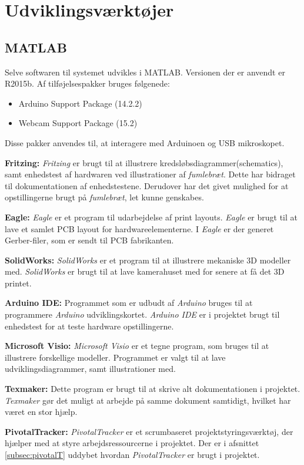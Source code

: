 \section{Udviklingsværktøjer}
\subsection{MATLAB}
Selve softwaren til systemet udvikles i MATLAB. Versionen der er anvendt er R2015b. Af tilføjelsespakker bruges følgenede:
\begin{itemize}
\item Arduino Support Package (14.2.2)
\item Webcam Support Package (15.2)
\end{itemize}
Disse pakker anvendes til, at interagere med Arduinoen og USB mikroskopet.

\textbf{Fritzing:} \textit{Fritzing} er brugt til at illustrere kredsløbsdiagrammer(schematics), samt enhedstest af hardwaren ved illustrationer af \textit{fumlebræt}. Dette har bidraget til dokumentationen af  enhedstestene. Derudover har det givet mulighed for at opstillingerne brugt på \textit{fumlebræt}, let kunne genskabes.

\textbf{Eagle:} \textit{Eagle} er et program til udarbejdelse af print layouts. \textit{Eagle} er brugt til at lave et samlet PCB layout for hardwareelementerne. I \textit{Eagle} er der generet Gerber-filer, som er sendt til PCB fabrikanten.

\textbf{SolidWorks:} \textit{SolidWorks} er et program til at illustrere mekaniske 3D modeller med.  \textit{SolidWorks} er brugt til at lave kamerahuset med for senere at få det 3D printet.

\textbf{Arduino IDE:} Programmet som er udbudt af \textit{Arduino} bruges til at programmere \textit{Arduino} udviklingskortet. \textit{Arduino IDE} er i projektet brugt til enhedstest for at teste hardware opstillingerne. 

\textbf{Microsoft Visio:} \textit{Microsoft Visio} er et tegne program, som bruges til at illustrere forskellige modeller. Programmet er valgt til at lave udviklingsdiagrammer, samt illustrationer med. 

\textbf{Texmaker:} Dette program er brugt til at skrive alt dokumentationen i projektet. \textit{Texmaker} gør det muligt at arbejde på samme dokument samtidigt, hvilket har været en stor hjælp.

\textbf{PivotalTracker:} \textit{PivotalTracker} er et scrumbaseret projektstyringsværktøj, der hjælper med at styre arbejdsressourcerne i projektet. Der er i afsnittet \ref{subsec:pivotalT} uddybet hvordan \textit{PivotalTracker} er brugt i projektet.

